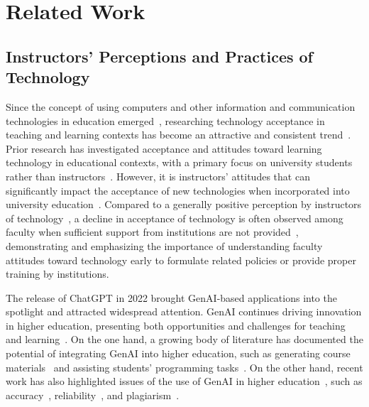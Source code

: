 \section{Related Work}
\subsection{Instructors' Perceptions and Practices of Technology}
Since the concept of using computers and other information and communication technologies in education emerged~\cite{nwana1990intelligent}, researching technology acceptance in teaching and learning contexts has become an attractive and consistent trend~\cite{imtiaz2014review, teo2011technology}. Prior research has investigated acceptance and attitudes toward learning technology in educational contexts, with a primary focus on university students rather than instructors~\cite{granic2019technology}. However, it is instructors' attitudes that can significantly impact the acceptance of new technologies when incorporated into university education~\cite{donnell2009relationship, hall2013assessing, palmore2011faculty, bunk2015understanding, kosak2004prepared}. 
Compared to a generally positive perception by instructors of technology~\cite{marzilli2014faculty, kopcha2016understanding, qudais2010senior, onwuagboke2016faculty, akbarilakeh2019attitudes}, a decline in acceptance of technology is often observed among faculty when sufficient support from institutions are not provided~\cite{ramlo2021coronavirus, daumiller2021shifting}, demonstrating and emphasizing the importance of understanding faculty attitudes toward technology early to formulate related policies or provide proper training by institutions.

The release of ChatGPT in 2022 brought GenAI-based applications into the spotlight and attracted widespread attention. GenAI continues driving innovation in higher education, presenting both opportunities and challenges for teaching and learning~\cite{michel2023challenges, adeshola2023opportunities}. On the one hand, a growing body of literature has documented the potential of integrating GenAI into higher education, such as generating course materials~\cite{denny2022robosourcing, sarsa2022automatic} and assisting students' programming tasks~\cite{lyu2024evaluating, poldrack2023ai}. On the other hand, recent work has also highlighted issues of the use of GenAI in higher education~\cite{kasneci2023chatgpt}, such as accuracy~\cite{johnson2023assessing}, reliability~\cite{johnson2023assessing, walker2023reliability}, and plagiarism~\cite{jarrah2023using}. 

